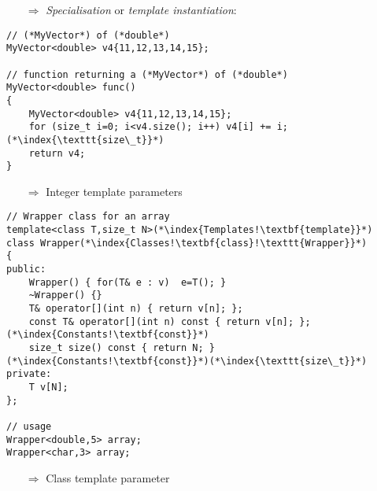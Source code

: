 \documentclass[10pt]{article}
\begin{document}
\begin{enumerate}
\item[$\Rightarrow$] \emph{Specialisation} or \emph{template instantiation}:
\end{enumerate}
\begin{lstlisting}
// (*MyVector*) of (*double*)
MyVector<double> v4{11,12,13,14,15};

// function returning a (*MyVector*) of (*double*)
MyVector<double> func()
{
    MyVector<double> v4{11,12,13,14,15};
    for (size_t i=0; i<v4.size(); i++) v4[i] += i;(*\index{\texttt{size\_t}}*)
    return v4;
}
\end{lstlisting}
\begin{enumerate}
\item[$\Rightarrow$] Integer template parameters
\end{enumerate}
\begin{lstlisting}
// Wrapper class for an array 
template<class T,size_t N>(*\index{Templates!\textbf{template}}*)
class Wrapper(*\index{Classes!\textbf{class}!\texttt{Wrapper}}*)
{
public:
    Wrapper() { for(T& e : v)  e=T(); }
    ~Wrapper() {}
    T& operator[](int n) { return v[n]; };
    const T& operator[](int n) const { return v[n]; };(*\index{Constants!\textbf{const}}*)
    size_t size() const { return N; }(*\index{Constants!\textbf{const}}*)(*\index{\texttt{size\_t}}*)
private:
    T v[N];
};

// usage
Wrapper<double,5> array;
Wrapper<char,3> array;
\end{lstlisting}
\begin{enumerate}
\item[$\Rightarrow$] Class template parameter
\end{enumerate}
\end{document}
